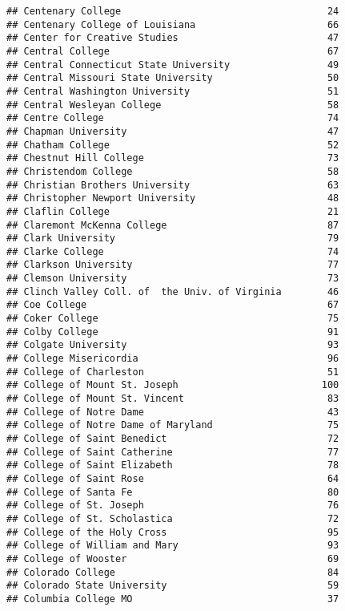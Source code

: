 \documentclass[
]{article}
\begin{document}
\begin{verbatim}
## Centenary College                                    24
## Centenary College of Louisiana                       66
## Center for Creative Studies                          47
## Central College                                      67
## Central Connecticut State University                 49
## Central Missouri State University                    50
## Central Washington University                        51
## Central Wesleyan College                             58
## Centre College                                       74
## Chapman University                                   47
## Chatham College                                      52
## Chestnut Hill College                                73
## Christendom College                                  58
## Christian Brothers University                        63
## Christopher Newport University                       48
## Claflin College                                      21
## Claremont McKenna College                            87
## Clark University                                     79
## Clarke College                                       74
## Clarkson University                                  77
## Clemson University                                   73
## Clinch Valley Coll. of  the Univ. of Virginia        46
## Coe College                                          67
## Coker College                                        75
## Colby College                                        91
## Colgate University                                   93
## College Misericordia                                 96
## College of Charleston                                51
## College of Mount St. Joseph                         100
## College of Mount St. Vincent                         83
## College of Notre Dame                                43
## College of Notre Dame of Maryland                    75
## College of Saint Benedict                            72
## College of Saint Catherine                           77
## College of Saint Elizabeth                           78
## College of Saint Rose                                64
## College of Santa Fe                                  80
## College of St. Joseph                                76
## College of St. Scholastica                           72
## College of the Holy Cross                            95
## College of William and Mary                          93
## College of Wooster                                   69
## Colorado College                                     84
## Colorado State University                            59
## Columbia College MO                                  37

\end{verbatim}
\end{document}
